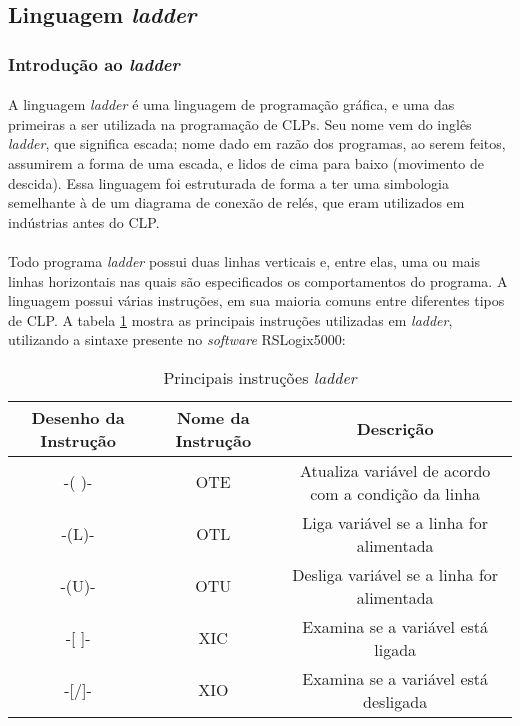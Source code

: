 \subsection{Linguagem \textit{ladder}}
\subsubsection{Introdução ao \textit{ladder}}
\paragraph{}A linguagem \textit{ladder} é uma linguagem de programação gráfica, e uma das primeiras a ser utilizada na programação de CLPs. Seu nome vem do inglês \textit{ladder}, que significa escada; nome dado em razão dos programas, ao serem feitos, assumirem a forma de uma escada, e lidos de cima para baixo (movimento de descida). Essa linguagem foi estruturada de forma a ter uma simbologia semelhante à de um diagrama de conexão de relés, que eram utilizados em indústrias antes do CLP.
\paragraph{}Todo programa \textit{ladder} possui duas linhas verticais e, entre elas, uma ou mais linhas horizontais nas quais são especificados os comportamentos do programa. A linguagem possui várias instruções, em sua maioria comuns entre diferentes tipos de CLP. A tabela \ref{ladder1} mostra as principais instruções utilizadas em \textit{ladder}, utilizando a sintaxe presente no \textit{software} RSLogix5000:

\begin{table}[!ht]
  \centering
  \caption{Principais instruções \textit{ladder} \label{ladder1}}
  \begin{tabular}{|c|c|c|}
    \hline
    Desenho da Instrução & Nome da Instrução & Descrição \\ \hline
    -( )- & OTE & Atualiza variável de acordo com a condição da linha \\ \hline
    -(L)- & OTL & Liga variável se a linha for alimentada \\ \hline
    -(U)- & OTU & Desliga variável se a linha for alimentada \\ \hline
    -[ ]- & XIC & Examina se a variável está ligada \\ \hline
    -[/]- & XIO & Examina se a variável está desligada \\ \hline
  \end{tabular}
\end{table}

